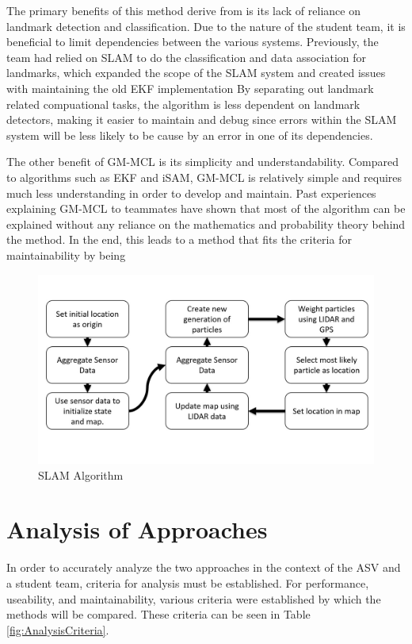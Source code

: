 \documentclass[10pt]{IEEEtran}
\begin{document}
The primary benefits of this method derive from is its lack of reliance
on landmark detection and classification.  Due to the nature of the student team, it is 
beneficial to limit dependencies between the various systems.  Previously, the team had
relied on SLAM to do the classification and data association for landmarks, which 
expanded the scope of the SLAM system and created issues with maintaining the old EKF
implementation
By separating out landmark related compuational tasks, the 
algorithm is less dependent on landmark detectors, making it easier to maintain and debug
since errors within the SLAM system will be less likely to be cause by an error in one of
its dependencies.

The other benefit of GM-MCL is its simplicity and understandability.  Compared to algorithms
such as EKF and iSAM, GM-MCL is relatively simple and requires much less understanding in 
order to develop and maintain.  Past experiences explaining GM-MCL to teammates have shown
that most of the algorithm can be explained without any reliance on the mathematics and 
probability theory behind the method.  In the end, this leads to a method that fits the
criteria for maintainability by being

\begin{figure}
\includegraphics[width=\columnwidth]{Figures/slamAlg}
\caption{SLAM Algorithm}
\label{fig:SlamAlg}
\end{figure}

\section{Analysis of Approaches}
In order to accurately analyze the two approaches in the context of the ASV and a student
team, criteria for analysis must be established.  For performance, useability, and 
maintainability, various criteria were established by which the methods will be compared.
These criteria can be seen in Table \ref{fig:AnalysisCriteria}.
\end{document}
